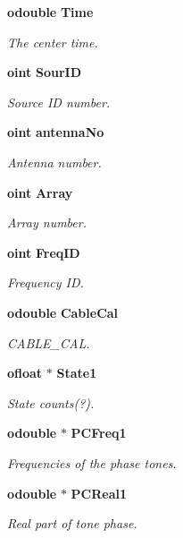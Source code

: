 \begin{CompactItemize}
{\bf odouble} {\bf Time}
\begin{CompactList}\small\item\em The center time. \item\end{CompactList}\item 
{\bf oint} {\bf Sour\-ID}
\begin{CompactList}\small\item\em Source ID number. \item\end{CompactList}\item 
{\bf oint} {\bf antenna\-No}
\begin{CompactList}\small\item\em Antenna number. \item\end{CompactList}\item 
{\bf oint} {\bf Array}
\begin{CompactList}\small\item\em Array number. \item\end{CompactList}\item 
{\bf oint} {\bf Freq\-ID}
\begin{CompactList}\small\item\em Frequency ID. \item\end{CompactList}\item 
{\bf odouble} {\bf Cable\-Cal}
\begin{CompactList}\small\item\em CABLE\_\-CAL. \item\end{CompactList}\item 
{\bf ofloat} $\ast$ {\bf State1}
\begin{CompactList}\small\item\em State counts(?). \item\end{CompactList}\item 
{\bf odouble} $\ast$ {\bf PCFreq1}
\begin{CompactList}\small\item\em Frequencies of the phase tones. \item\end{CompactList}\item 
{\bf odouble} $\ast$ {\bf PCReal1}
\begin{CompactList}\small\item\em Real part of tone phase. \item\end{CompactList}\item 

\end{CompactItemize}
